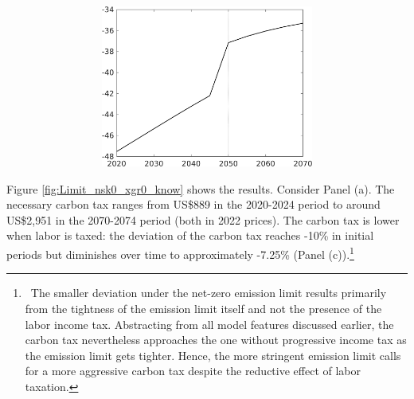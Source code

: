 \begin{figure}[h!!]
\begin{subfigure}[]{1\textwidth}
\begin{subfigure}[]{0.4\textwidth}
\includegraphics[width=1\textwidth]{../../codding_model/own_basedOnFried/optimalPol_010922_revision/figures/all_13Sept22/CompTaufPER_bytaul_Reg5_sgsff_spillover0_nsk0_xgr0_knspil0_sep0_LFlimit1_emsbase0_countec0_GovRev0_etaa0.79_lgd0.png} 
\end{subfigure}		
\end{subfigure}			
 \end{figure} 
 
 
Figure \ref{fig:Limit_nsk0_xgr0_know} shows the results.
Consider Panel (a). The necessary carbon tax ranges from US\$889  in the 2020-2024 period to around US\$2,951 in the 2070-2074 period (both in 2022 prices). The carbon tax is lower when labor is taxed: the deviation of the carbon tax reaches -10\% in initial periods but diminishes over time to approximately -7.25\% (Panel (c)).\footnote{\ The smaller deviation under the net-zero emission limit results primarily from the tightness of the emission limit itself and not the presence of the labor income tax. Abstracting from all model features discussed earlier, the carbon tax nevertheless approaches the one without progressive income tax as the emission limit gets tighter. Hence, the more stringent emission limit calls for a more aggressive carbon tax despite the reductive effect of labor taxation.}

